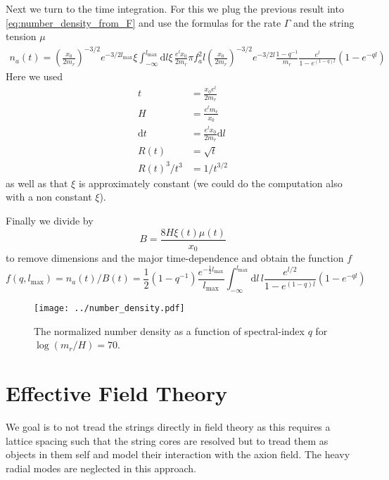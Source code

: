 \documentclass[a4paper]{article}
\begin{document}
Next we turn to the time integration. For this we plug the previous result into \eqref{eq:number_density_from_F} and use the formulas for the rate $\Gamma$ and the string tension $\mu$
\begin{align}
	n_a(t) = \left( \frac{x_0}{2 m_r} \right)^{-3/2} e^{-3/2 l_\mathrm{max}} \xi \int_{-\infty}^{l_\mathrm{max}} \mathrm{d} l \xi \, \frac{e^l x_0}{2 m_r} \pi f_a^2 l  \left( \frac{x_0}{2 m_r} \right)^{-3/2} e^{-3/2 l} \frac{1 - q^{-1}}{m_r} \frac{e^l}{1 - e^{(1 - q) l}} (1 - e^{-ql})
\end{align}
Here we used 
\begin{align}
	t &= \frac{x_0 e^l}{2 m_r} \\
	H  &= \frac{e^{l} m_r}{x_0} \\
	\mathrm{d} t &= \frac{e^l x_0}{2 m_r} \mathrm{d} l \\
	R(t) &= \sqrt{t} \\
	R(t)^3 / t^3 &= 1 / t^{3/2}
\end{align}
as well as that $\xi$ is approximately constant (we could do the computation also with a non constant $\xi$).

Finally we divide by 
\begin{equation}
	B = \frac{8 H \xi(t) \mu(t)}{x_0}
\end{equation}
to remove dimensions and the major time-dependence 
and obtain the function $f$
\begin{equation}
	f(q, l_\mathrm{max}) = n_a(t) / B(t) = \frac{1}{2} (1 - q^{-1}) \frac{e^{- \frac{1}{2} l_\mathrm{max}}}{l_\mathrm{max}} \int_{-\infty}^{l_\mathrm{max}} \mathrm{d} l \, l \frac{e^{l/2}}{1 - e^{(1 - q) l}} (1 - e^{-ql})
\end{equation}

\begin{figure}
	\texttt{[image: ../number\_density.pdf]}
	\caption{The normalized number density as a function of spectral-index $q$ for $\log(m_r/H) = 70$.}
\end{figure}

\section{Effective Field Theory}
We goal is to not tread the strings directly in field theory as this requires a lattice spacing such that the 
string cores are resolved but to tread them as objects in them self and model their interaction with the axion field.
The heavy radial modes are neglected in this approach. 
\end{document}
